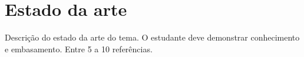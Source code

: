 \chapter{Estado da arte}

Descrição do estado da arte do tema. O estudante deve demonstrar conhecimento e embasamento. Entre 5 a 10 referências.

